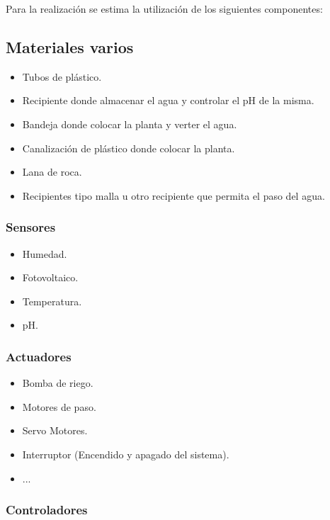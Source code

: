 \documentclass[12pt,a4paper,titlepage,oneside]{report}
\begin{document}
	Para la realización se estima la utilización de los siguientes componentes:	
	
	\subsection*{Materiales varios}
	
		\begin{itemize}
			\item Tubos de plástico.	
			\item Recipiente donde almacenar el agua y controlar el pH de la misma.
			\item Bandeja donde colocar la planta y verter el agua.
			\item Canalización de plástico donde colocar la planta.
			\item Lana de roca.
			\item Recipientes tipo malla u otro recipiente que permita el paso del agua.
		\end{itemize}			
	
	\subsubsection*{Sensores}

		\begin{itemize}
			\item Humedad.
			\item Fotovoltaico.
			\item Temperatura.
			\item pH.
		\end{itemize}

	\subsubsection*{Actuadores}

		\begin{itemize}
			\item Bomba de riego.
			\item Motores de paso.
			\item Servo Motores.
			\item Interruptor (Encendido y apagado del sistema).
			\item ...
		\end{itemize}			
	
	\subsubsection*{Controladores}
		
\end{document}
